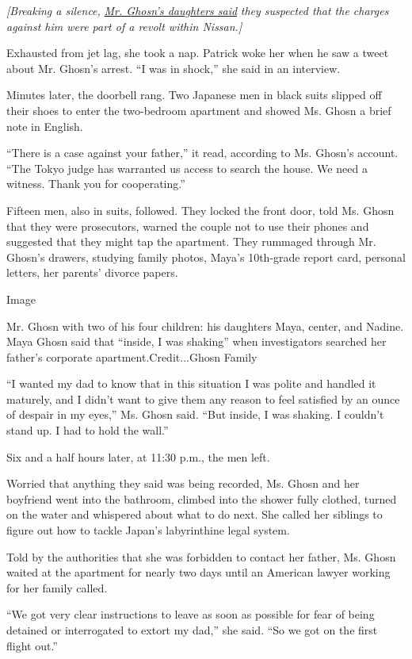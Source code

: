 \emph{{[}Breaking a silence,}
\emph{\href{https://www.nytimes.com/2018/12/29/business/carlos-ghosn-nissan-children.html}{Mr.
Ghosn's daughters said}} \emph{they suspected that the charges against
him were part of a revolt within Nissan.{]}}

Exhausted from jet lag, she took a nap. Patrick woke her when he saw a
tweet about Mr. Ghosn's arrest. ``I was in shock,'' she said in an
interview.

Minutes later, the doorbell rang. Two Japanese men in black suits
slipped off their shoes to enter the two-bedroom apartment and showed
Ms. Ghosn a brief note in English.

``There is a case against your father,'' it read, according to Ms.
Ghosn's account. ``The Tokyo judge has warranted us access to search the
house. We need a witness. Thank you for cooperating.''

Fifteen men, also in suits, followed. They locked the front door, told
Ms. Ghosn that they were prosecutors, warned the couple not to use their
phones and suggested that they might tap the apartment. They rummaged
through Mr. Ghosn's drawers, studying family photos, Maya's 10th-grade
report card, personal letters, her parents' divorce papers.

Image

Mr. Ghosn with two of his four children: his daughters Maya, center, and
Nadine. Maya Ghosn said that ``inside, I was shaking'' when
investigators searched her father's corporate apartment.Credit...Ghosn
Family

``I wanted my dad to know that in this situation I was polite and
handled it maturely, and I didn't want to give them any reason to feel
satisfied by an ounce of despair in my eyes,'' Ms. Ghosn said. ``But
inside, I was shaking. I couldn't stand up. I had to hold the wall.''

Six and a half hours later, at 11:30 p.m., the men left.

Worried that anything they said was being recorded, Ms. Ghosn and her
boyfriend went into the bathroom, climbed into the shower fully clothed,
turned on the water and whispered about what to do next. She called her
siblings to figure out how to tackle Japan's labyrinthine legal system.

Told by the authorities that she was forbidden to contact her father,
Ms. Ghosn waited at the apartment for nearly two days until an American
lawyer working for her family called.

``We got very clear instructions to leave as soon as possible for fear
of being detained or interrogated to extort my dad,'' she said. ``So we
got on the first flight out.''

